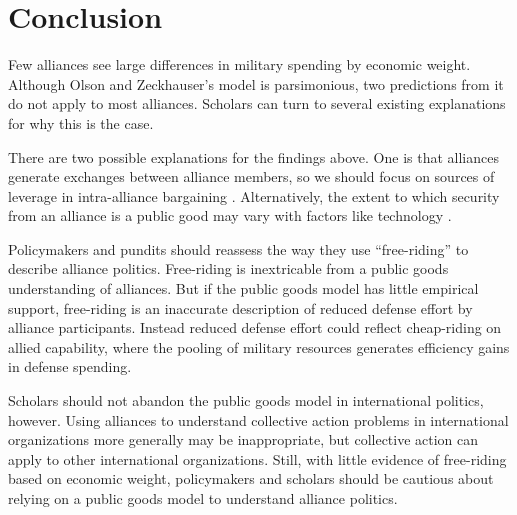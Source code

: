 \documentclass[12pt]{article}
\begin{document}
\section{Conclusion}

Few alliances see large differences in military spending by economic weight. 
Although Olson and Zeckhauser's model is parsimonious, two predictions from it do not apply to most alliances. 
Scholars can turn to several existing explanations for why this is the case. 


There are two possible explanations for the findings above. 
One is that alliances generate exchanges between alliance members, so we should focus on sources of leverage in intra-alliance bargaining \citep{Morrow1991, Norrlof2010, Brooksetal2013, Johnson2015, Kim2016}. 
Alternatively, the extent to which security from an alliance is a public good may vary with factors like technology \citep{SandlerHartley2001}. 


Policymakers and pundits should reassess the way they use ``free-riding'' to describe alliance politics. 
Free-riding is inextricable from a public goods understanding of alliances.
But if the public goods model has little empirical support, free-riding is an inaccurate description of reduced defense effort by alliance participants.  
Instead reduced defense effort could reflect cheap-riding on allied capability, where the pooling of military resources generates efficiency gains in defense spending. 


Scholars should not abandon the public goods model in international politics, however.   
Using alliances to understand collective action problems in international organizations more generally \citet[pg. 266-7]{OlsonZeckhauser1966} may be inappropriate, but collective action can apply to other international organizations. 
Still, with little evidence of free-riding based on economic weight, policymakers and scholars should be cautious about relying on a public goods model to understand alliance politics.  



\singlespace


 
\end{document}
